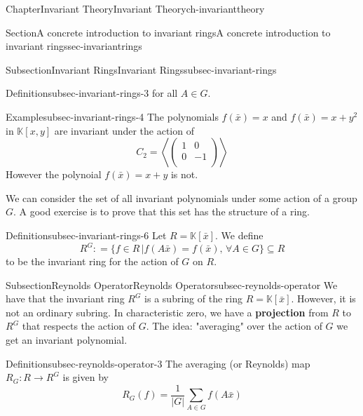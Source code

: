 \documentclass[oneside,10pt,]{book}
\newcommand{\terminology}[1]{\textbf{#1}}
\newcommand{\amp}{&}
\begin{document}
\begin{chapterptx}{Chapter}{Invariant Theory}{}{Invariant Theory}{}{}{ch-invarianttheory}
\begin{sectionptx}{Section}{A concrete introduction to invariant rings}{}{A concrete introduction to invariant rings}{}{}{sec-invariantrings}
\begin{subsectionptx}{Subsection}{Invariant Rings}{}{Invariant Rings}{}{}{subsec-invariant-rings}
\begin{definition}{Definition}{}{subsec-invariant-rings-3}
for all \(A \in G\).%
\end{definition}
\begin{example}{Example}{}{subsec-invariant-rings-4}%
The polynomials \(f(\bar x)=x\) and \(f(\bar x) = x +y^2\) in \(\mathbb{K}[x,y]\) are invariant under the action of%
\begin{equation*}
C_2 = \left\langle\begin{pmatrix}
1 \amp 0 \\
0 \amp -1 \\
\end{pmatrix} \right\rangle
\end{equation*}
However the polynoial \(f(\bar x)=x+y\) is not.%
\end{example}
We can consider the set of all invariant polynomials under some action of a group \(G \). A good exercise is to prove that this set has the structure of a ring.%
\begin{definition}{Definition}{}{subsec-invariant-rings-6}%
Let \(R= \mathbb{K}[\bar x]\). We define%
\begin{equation*}
R^G : =  \{f \in R \, | f(A\bar x) = f(\bar x), \, \forall A \in G\} \subseteq R
\end{equation*}
to be the invariant ring for the action of \(G\) on \(R\).%
\end{definition}
\end{subsectionptx}
%
%
\typeout{************************************************}
\typeout{************************************************}
%
\begin{subsectionptx}{Subsection}{Reynolds Operator}{}{Reynolds Operator}{}{}{subsec-reynolds-operator}
We have that the invariant ring \(R^G\) is a subring of the ring \(R= \mathbb{K}[\bar x]\). However, it is not an ordinary subring. In characteristic zero, we have a \terminology{projection} from \(R\) to \(R^G\) that respects the action of \(G\). The idea: "averaging" over the action of \(G\) we get an invariant polynomial.%
\begin{definition}{Definition}{}{subsec-reynolds-operator-3}%
The averaging (or Reynolds) map \(R_G: R \xrightarrow{} R^G\) is given by%
\begin{equation*}
R_G(f) = \frac{1}{|G|} \sum_{A\in G} f(A \bar x) 
\end{equation*}
%
\end{definition}
\end{subsectionptx}
\end{sectionptx}
\end{chapterptx}
\end{document}
